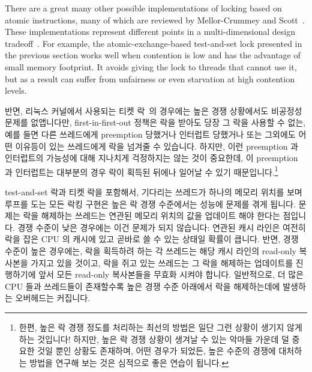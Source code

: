 There are a great many other possible implementations of locking
based on atomic instructions, many of which are reviewed
by Mellor-Crummey and Scott~\cite{MellorCrummey91a}.
These implementations represent different points in a multi-dimensional
design tradeoff~\cite{McKenney96a}.
For example,
the atomic-exchange-based test-and-set lock presented in the previous
section works well when contention is low and has the advantage
of small memory footprint.
It avoids giving the lock to threads that cannot use it, but as
a result can suffer from unfairness or even starvation at high
contention levels.
\fi

반면, 리눅스 커널에서 사용되는 티켓 락~\cite{MellorCrummey91a}의 경우에는 높은
경쟁 상황에서도 비공정성 문제를 없앱니다만, first-in-first-out 정책은 락을
받아도 당장 그 락을 사용할 수 없는, 예를 들면 다른 쓰레드에게 preemption
당했거나 인터럽트 당했거나 또는 그외에도 어떤 이유등이 있는 쓰레드에게 락을
넘겨줄 수 있습니다.
하지만, 이런 preemption 과 인터럽트의 가능성에 대해 지나치게 걱정하지는 않는
것이 중요한데, 이 preemption 과 인터럽트는 대부분의 경우 락이 획득된 뒤에나
일어날 수 있기 때문입니다.\footnote{
	한편, 높은 락 경쟁 정도를 처리하는 최선의 방법은 일단 그런 상황이
	생기지 않게 하는 것입니다!
	하지만, 높은 락 경쟁 상황이 생겨날 수 있는 악마들 가운데 덜 중요한 것일
	뿐인 상황도 존재하며, 어떤 경우가 되었든, 높은 수준의 경쟁에 대처하는
	방법을 연구해 보는 것은 심적으로 좋은 연습이 됩니다.}

test-and-set 락과 티켓 락을 포함해서, 기다리는 쓰레드가 하나의 메모리 위치를
보며 루프를 도는 모든 락킹 구현은 높은 락 경쟁 수준에서는 성능에 문제를 겪게
됩니다.
문제는 락을 해제하는 쓰레드는 연관된 메모리 위치의 값을 업데이트 해야 한다는
점입니다.
경쟁 수준이 낮은 경우에는 이건 문제가 되지 않습니다: 연관된 캐시 라인은 여전히
락을 잡은 CPU 의 캐시에 있고 곧바로 쓸 수 있는 상태일 확률이 큽니다.
반면, 경쟁 수준이 높은 경우에는, 락을 획득하려 하는 각 쓰레드는 해당 캐시
라인의 read-only 복사본을 가지고 있을 것이고, 락을 쥐고 있는 쓰레드는 그 락을
해제하는 업데이트를 진행하기에 앞서 모든 read-only 복사본들을 무효화 시켜야
합니다.
일반적으로, 더 많은 CPU 들과 쓰레드들이 존재할수록 높은 경쟁 수준 아래에서 락을
해제하는데에 발생하는 오버헤드는 커집니다.
\iffalse

